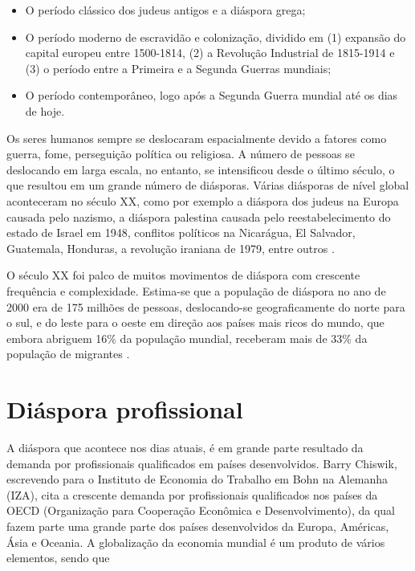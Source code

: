 \documentclass[12pt,openright,oneside,a4paper,
english,french,spanish,brazil]{abntex2}
\begin{document}
\begin{itemize}
	\item O período clássico dos judeus antigos e a diáspora grega;
	\item O período moderno de escravidão e colonização, dividido em (1) expansão do capital europeu entre 1500-1814, (2) a Revolução Industrial de 1815-1914 e (3) o período entre a Primeira e a Segunda Guerras mundiais;
	\item O período contemporâneo, logo após a Segunda Guerra mundial até os dias de hoje.
	\cite[p. 41-60]{reis}
\end{itemize}

Os seres humanos sempre se deslocaram espacialmente devido a fatores como guerra, fome, perseguição política ou religiosa. A número de pessoas se deslocando em larga escala, no entanto, se intensificou desde o último século, o que resultou em um grande número de diásporas. Várias diásporas de nível global aconteceram no século XX, como por exemplo a diáspora dos judeus na Europa causada pelo nazismo, a diáspora palestina causada pelo reestabelecimento do estado de Israel em 1948, conflitos políticos na Nicarágua, El Salvador, Guatemala, Honduras, a revolução iraniana de 1979, entre outros \cite[p. 25]{wan_diaspora_2011}.

O século XX foi palco de muitos movimentos de diáspora com crescente frequência e complexidade. Estima-se que a população de diáspora no ano de 2000 era de 175 milhões de pessoas, deslocando-se geograficamente do norte para o sul, e do leste para o oeste em direção aos países mais ricos do mundo, que embora abriguem 16\% da população mundial, receberam mais de 33\% da população de migrantes \cite[p. 26]{wan_diaspora_2011}.

\section{Diáspora profissional}

A diáspora que acontece nos dias atuais, é em grande parte resultado da demanda por profissionais qualificados em países desenvolvidos. Barry Chiswik, escrevendo para o Instituto de Economia do Trabalho em Bohn na Alemanha (IZA), cita a crescente demanda por profissionais qualificados nos países da OECD (Organização para Cooperação Econômica e Desenvolvimento), da qual fazem parte uma grande parte dos países desenvolvidos da Europa, Américas, Ásia e Oceania. A globalização da economia mundial é um produto de vários elementos, sendo que 
\end{document}
